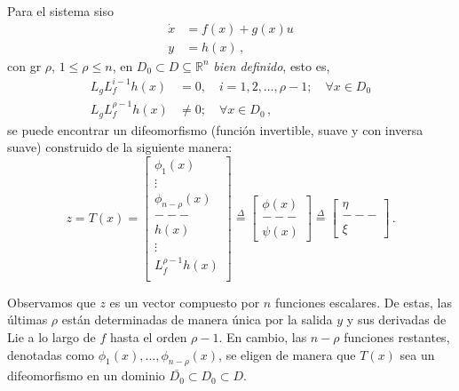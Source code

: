 Para el sistema \gls{siso}
\begin{equation}
	\begin{aligned}
		\dot{x} & = f(x) + g(x)u \\
		y       & = h(x) \, ,
	\end{aligned}
	\label{eq:siso}
\end{equation}
con \gls{gr} $\rho$, $1 \leq \rho \leq n$, en $D_0 \subset D \subseteq \mathbb{R}^n$ \textit{bien definido}, esto es,
\begin{equation}
	\begin{aligned}
		L_g L_f^{i-1} h(x)    & = 0, \quad i = 1, 2, \ldots, \rho-1; \quad \forall x \in D_0 \\
		L_g L_f^{\rho-1} h(x) & \neq 0 ; \quad \forall x \in D_0 \, ,
	\end{aligned}
	\label{eq:gr2}
\end{equation}
se puede encontrar un difeomorfismo (función invertible, suave y con inversa suave) construido de la siguiente manera:
\begin{equation}
	z = T(x) = \begin{bmatrix}
		\phi_1(x)         \\
		\vdots            \\
		\phi_{n-\rho}(x)  \\
		- - -             \\
		h(x)              \\
		\vdots            \\
		L_f^{\rho-1} h(x) \\
	\end{bmatrix} \overset{\Delta}{=} \begin{bmatrix}
		\phi(x) \\
		- - -   \\
		\psi(x)
	\end{bmatrix} \overset{\Delta}{=} \begin{bmatrix}
		\eta  \\
		- - - \\
		\xi
	\end{bmatrix} \, .
	\label{eq:difeomorfismo}
\end{equation}

Observamos que $z$ es un vector compuesto por $n$ funciones escalares. De estas, las últimas $\rho$ están determinadas de manera única por la salida $y$ y sus derivadas de Lie a lo largo de $f$ hasta el orden $\rho-1$. En cambio, las $n-\rho$ funciones restantes, denotadas como $ \phi_1(x), \ldots , \phi_{n-\rho}(x) $, se eligen de manera que $T(x)$ sea un difeomorfismo en un dominio $\bar{D_0} \subset D_0 \subset D$.  \\

